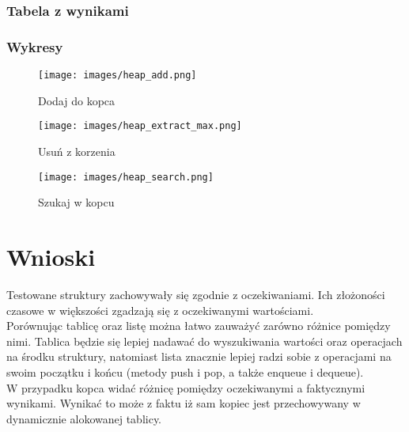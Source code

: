 \documentclass{article}
\begin{document}
\subsubsection{Tabela z wynikami}
\begin{table}[h]
\end{table}
\subsubsection{Wykresy}
\begin{figure}[h]
    \centering
    \texttt{[image: images/heap\_add.png]}
    \caption{Dodaj do kopca}
\end{figure}
\begin{figure}[H]
    \centering
    \texttt{[image: images/heap\_extract\_max.png]}
    \caption{Usuń z korzenia}
\end{figure}
\begin{figure}[H]
    \centering
    \texttt{[image: images/heap\_search.png]}
    \caption{Szukaj w kopcu}
\end{figure}
\clearpage
\section{Wnioski}
Testowane struktury zachowywały się zgodnie z oczekiwaniami. Ich złożoności czasowe w większości zgadzają się z oczekiwanymi wartościami. \\
Porównując tablicę oraz listę można łatwo zauważyć zarówno różnice pomiędzy nimi. Tablica będzie się lepiej nadawać do wyszukiwania wartości oraz operacjach na środku struktury, natomiast lista znacznie lepiej radzi sobie z operacjami na swoim początku i końcu (metody push i pop, a także enqueue i dequeue).\\
W przypadku kopca widać różnicę pomiędzy oczekiwanymi a faktycznymi wynikami. Wynikać to może z faktu iż sam kopiec jest przechowywany w dynamicznie alokowanej tablicy. 
\end{document}
